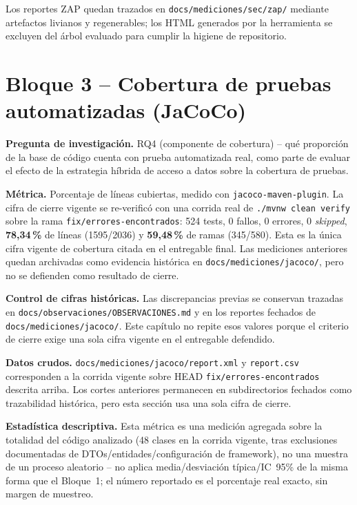 Los reportes ZAP quedan trazados en
\texttt{docs/mediciones/sec/zap/} mediante artefactos livianos y
regenerables; los HTML generados por la herramienta se excluyen del
árbol evaluado para cumplir la higiene de repositorio.

\section{Bloque 3 -- Cobertura de pruebas automatizadas (JaCoCo)}
\label{sec:res-cobertura}

\textbf{Pregunta de investigación.} RQ4 (componente de cobertura) -- qué
proporción de la base de código cuenta con prueba automatizada real, como
parte de evaluar el efecto de la estrategia híbrida de acceso a datos
sobre la cobertura de pruebas.

\textbf{Métrica.} Porcentaje de líneas cubiertas, medido con
\texttt{jacoco-maven-plugin}. La cifra de cierre
vigente se re-verificó con una corrida real de \texttt{./mvnw clean verify}
sobre la rama \texttt{fix/errores-encontrados}: 524
tests, 0 fallos, 0 errores, 0 \emph{skipped}, \textbf{78,34\,\%} de líneas
(1595/2036) y \textbf{59,48\,\%} de ramas (345/580). Esta es la única cifra vigente de cobertura citada en el
entregable final. Las mediciones anteriores quedan archivadas como
evidencia histórica en \texttt{docs/mediciones/jacoco/}, pero no se
defienden como resultado de cierre.

\textbf{Control de cifras históricas.} Las discrepancias previas se
conservan trazadas en \texttt{docs/observaciones/OBSERVACIONES.md} y en
los reportes fechados de \texttt{docs/mediciones/jacoco/}. Este capítulo
no repite esos valores porque el criterio de cierre exige una sola cifra
vigente en el entregable defendido.

\textbf{Datos crudos.} \texttt{docs/mediciones/jacoco/report.xml} y
\texttt{report.csv} corresponden a la corrida vigente sobre HEAD
\texttt{fix/errores-encontrados} descrita arriba. Los cortes anteriores permanecen en
subdirectorios fechados como trazabilidad histórica, pero esta sección
usa una sola cifra de cierre.

\textbf{Estadística descriptiva.} Esta métrica es una medición agregada
sobre la totalidad del código analizado (48 clases en la corrida
vigente, tras exclusiones documentadas de DTOs/entidades/configuración
de framework), no una muestra de un proceso aleatorio -- no aplica
media/desviación típica/IC~95\% de la misma forma que el Bloque~1; el
número reportado es el porcentaje real exacto, sin margen de muestreo.


